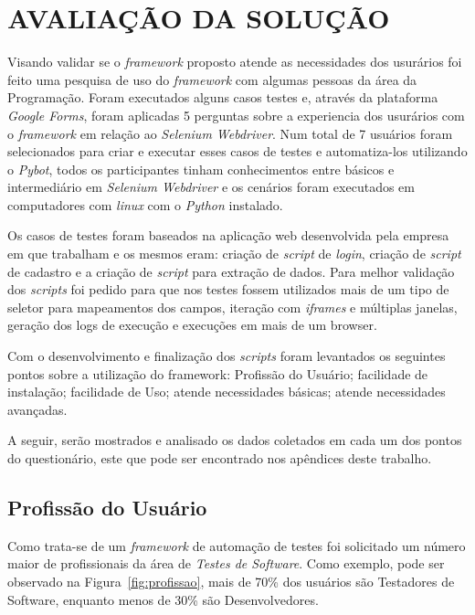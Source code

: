 
\chapter{AVALIAÇÃO DA SOLUÇÃO}\label{chap:result}

    Visando validar se o \textit{framework} proposto atende as necessidades dos usurários foi feito uma pesquisa de uso do \textit{framework} com algumas
    pessoas da área da Programação. Foram executados alguns casos testes e, através da plataforma \textit{Google Forms}, foram aplicadas 5 perguntas
    sobre a experiencia dos usurários com o \textit{framework} em relação ao \textit{Selenium Webdriver}. Num total de 7 usuários foram selecionados
    para criar e executar esses casos de testes e automatiza-los utilizando o \textit{Pybot}, todos os participantes tinham conhecimentos entre básicos
    e intermediário em \textit{Selenium Webdriver} e os cenários foram executados em computadores com \textit{linux} com o \textit{Python} instalado.

    Os casos de testes foram baseados na aplicação web desenvolvida pela empresa em que trabalham e os mesmos eram: criação de \textit{script} de
    \textit{login}, criação de \textit{script} de cadastro e a criação de \textit{script} para extração de dados. Para melhor validação dos \textit{scripts}
    foi pedido para que nos testes fossem utilizados mais de um tipo de seletor para mapeamentos dos campos, iteração com \textit{iframes} e múltiplas
    janelas, geração dos logs de execução e execuções em mais de um browser.

    Com o desenvolvimento e finalização dos \textit{scripts} foram levantados os seguintes pontos sobre a utilização do framework:
    Profissão do Usuário;
    facilidade de instalação;
    facilidade de Uso;
    atende necessidades básicas;
    atende necessidades avançadas.

    A seguir, serão mostrados e analisado os dados coletados em cada um dos pontos do questionário, este que pode ser encontrado nos apêndices deste trabalho.

    \section{Profissão do Usuário}
        Como trata-se de um \textit{framework} de automação de testes foi solicitado um número maior de profissionais da área de \textit{Testes de Software}.
        Como exemplo, pode ser observado na Figura~\ref{fig:profissao}, mais de 70\% dos usuários são Testadores de Software, enquanto menos de 30\% são
        Desenvolvedores.

